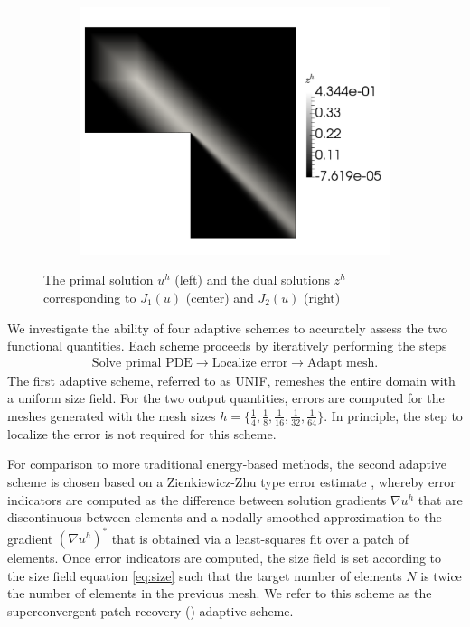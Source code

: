 \begin{figure}[hbt!]
\begin{subfigure}{.3\textwidth}
\includegraphics[width=.99\linewidth]{img/vms_lshape_square_zh}
\end{subfigure}
\caption{The primal solution $u^h$ (left) and the dual
solutions $z^h$ corresponding to $J_1(u)$ (center)
and $J_2(u)$ (right)}
\label{fig:lshape_solutions}
\end{figure}

We investigate the ability of four adaptive schemes
to accurately assess the two functional quantities.
Each scheme proceeds by iteratively performing the
steps
%
\begin{gather*}
\text{Solve primal PDE} \rightarrow
\text{Localize error} \rightarrow
\text{Adapt mesh}.
\end{gather*}
%
The first adaptive scheme, referred to as
\textsc{UNIF}, remeshes the entire domain
with a uniform size field. For the two output quantities,
errors are computed for the meshes generated with the
mesh sizes
$h = \{ \frac{1}{4}, \frac{1}{8}, \frac{1}{16},
\frac{1}{32}, \frac{1}{64} \}$. In principle, the
step to localize the error is not required for this
scheme.

For comparison to more traditional energy-based methods,
the second adaptive scheme is chosen based
on a Zienkiewicz-Zhu type error estimate
\cite{zienkiewicz1992superconvergenti}
\cite{zienkiewicz1992superconvergentii},
whereby error indicators are computed as the difference
between solution gradients $\nabla u^h$ that are
discontinuous between elements and a nodally
smoothed approximation to the gradient
$(\nabla u^h)^*$ that is obtained via a
least-squares fit over a patch of elements.
Once error indicators are computed,
the size field is set according to the size
field equation \eqref{eq:size} such that the
target number of elements $N$ is twice the number
of elements in the previous mesh.
We refer to this scheme as the superconvergent
patch recovery () adaptive scheme.

